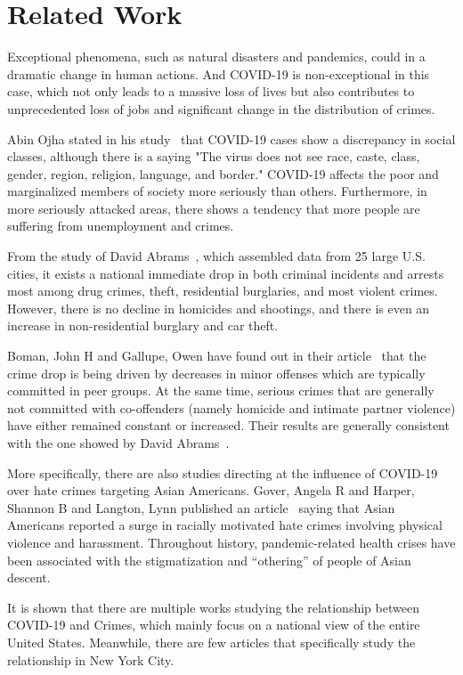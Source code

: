 \documentclass[conference]{IEEEtran}
\begin{document}
\section{Related Work}
Exceptional phenomena, such as natural disasters and pandemics, could in a dramatic change in human actions. And COVID-19 is non-exceptional in this case, which not only leads to a massive loss of lives but also contributes to unprecedented loss of jobs and significant change in the distribution of crimes.

Abin Ojha stated in his study~\cite{ojha2020pandemic} that COVID-19 cases show a discrepancy in social classes, although there is a saying "The virus does not see race, caste, class, gender, region, religion, language, and border." COVID-19 affects the poor and marginalized members of society more seriously than others. Furthermore, in more seriously attacked areas, there shows a tendency that more people are suffering from unemployment and crimes.

From the study of David Abrams~\cite{abrams2020covid}, which assembled data from 25 large U.S. cities, it exists a national immediate drop in both criminal incidents and arrests most among drug crimes, theft, residential burglaries, and most violent crimes. However,  there is no decline in homicides and shootings, and there is even an increase in non-residential burglary and car theft.

Boman, John H and Gallupe, Owen have found out in their article~\cite{boman2020has} that the crime drop is being driven by decreases in minor offenses which are typically committed in peer groups. At the same time, serious crimes that are generally not committed with co-offenders (namely homicide and intimate partner violence) have either remained constant or increased. Their results are generally consistent with the one showed by David Abrams~\cite{abrams2020covid}.

More specifically, there are also studies directing at the influence of COVID-19 over hate crimes targeting Asian Americans. Gover, Angela R and Harper, Shannon B and Langton, Lynn published an article~\cite{gover2020anti} saying that Asian Americans reported a surge in racially motivated hate crimes involving physical violence and harassment. Throughout history, pandemic-related health crises have been associated with the stigmatization and “othering” of people of Asian descent.

It is shown that there are multiple works studying the relationship between COVID-19 and Crimes, which mainly focus on a national view of the entire United States. Meanwhile, there are few articles that specifically study the relationship in New York City.
\end{document}
